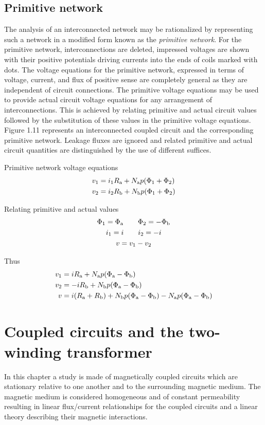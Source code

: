 \documentclass[a4paper,numbers=noenddot,12pt]{scrbook}
\begin{document}
\section{Primitive network}
The analysis of an interconnected network may be rationalized by representing such a network in a modified form known as the \textit{primitive network}. For the primitive network, interconnections are deleted, impressed voltages are shown with their positive potentials driving currents into the ends of coils marked with dots. The voltage equations for the primitive network, expressed in terms of voltage, current, and flux of positive sense are completely general as they are independent of circuit connections. 
The primitive voltage equations may be used to provide actual circuit voltage equations for any arrangement of interconnections. This is achieved by relating primitive and actual circuit values followed by the substitution of these values in the primitive voltage equations. 
Figure 1.11 represents an interconnected coupled circuit and the corresponding primitive network. Leakage fluxes are ignored and related primitive and actual circuit quantities are distinguished by the use of different suffices.

Primitive network voltage equations
\begin{align*}
    v_1 & = i_1 R_\textup{a} + N_\textup{a} p (\Phi_1 + \Phi_2) \\
    v_2 & = i_2 R_\textup{b} + N_\textup{b} p (\Phi_1 + \Phi_2) \\ 
\end{align*}

Relating primitive and actual values
\begin{gather*}
    \Phi_1 = \Phi_\textup{a} \qquad \Phi_2 = - \Phi_\textup{b} \\
    i_1 = i \qquad i_2 = -i \\
    v = v_1 - v_2
\end{gather*}

Thus
\begin{align*}
    v_1 & = i R_\textup{a} + N_\textup{a} p (\Phi_\textup{a} - \Phi_\textup{b}) \\
    v_2 & = -i R_\textup{b} + N_\textup{b} p (\Phi_\textup{a} - \Phi_\textup{b}) \\
    v & = i (R_\textup{a} + R_\textup{b}) + N_\textup{b} p (\Phi_\textup{a} - \Phi_\textup{b}) - N_\textup{a} p (\Phi_\textup{a} - \Phi_\textup{b})
\end{align*}

\chapter{Coupled circuits and the two-winding transformer}
In this chapter a study is made of magnetically coupled circuits which are stationary relative to one another and to the surrounding magnetic medium. The magnetic medium is considered homogeneous and of constant permeability resulting in linear flux/current relationships for the coupled circuits and a linear theory describing their 
magnetic interactions.
\end{document}
